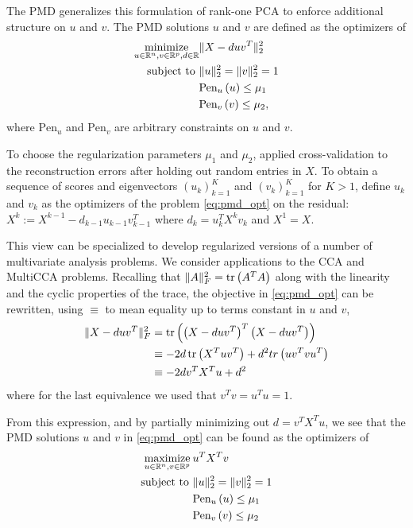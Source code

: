 \documentclass[utf8]{frontiersFPHY} %
\begin{document}
The PMD generalizes this formulation of rank-one PCA to enforce additional
structure on $u$ and $v$. The PMD solutions $u$ and $v$ are defined as the
optimizers of
\begin{align}
\label{eq:pmd_opt} \mathop\mathrm{minimize}_{u \in \mathbb{R}^{n}, v \in \mathbb{R}^{p}, d
  \in \mathbb{R}} &\|X - duv^{T}\|_{2}^{2} \\ \text{subject to } &\|u\|_{2}^{2} =
\|v\|_{2}^{2} = 1 \nonumber \\ & \text{Pen}_{u}\left(u\right) \leq \mu_{1}
\nonumber \\ & \text{Pen}_{v}\left(v\right) \leq \mu_{2}, \nonumber
\end{align}
where $\text{Pen}_u$ and $\text{Pen}_v$ are arbitrary constraints on $u$ and
$v$.

To choose the regularization parameters $\mu_{1}$ and $\mu_{2}$,
\citep{witten2009penalized} applied cross-validation to the reconstruction
errors after holding out random entries in $X$. To obtain a sequence of scores
and eigenvectors $\left(u_{k}\right)_{k = 1}^{K}$ and $\left(v_{k}\right)_{k =
  1}^{K}$ for $K > 1$, define $u_{k}$ and $v_{k}$ as the optimizers of the
problem \ref{eq:pmd_opt} on the residual: $X^{k} := X^{k - 1} - d_{k - 1}u_{k -
  1}v_{k - 1}^{T}$ where $d_{k} = u_{k}^{T} X^{k}v_{k}$ and $X^{1} = X$.

This view can be specialized to develop regularized versions of a number of
multivariate analysis problems. We consider applications to the CCA and MultiCCA
problems. Recalling that $\|A\|_{F}^{2} = \mathop\mathrm{tr}\left(A^{T}A\right)$ along with the
linearity and the cyclic properties of the trace, the objective in
\ref{eq:pmd_opt} can be rewritten, using $\equiv$ to mean equality up to terms
constant in $u$ and $v$,
\begin{align*}
  \|X - duv^{T}\|_{F}^{2} &= \mathop\mathrm{tr}\left(\left(X - duv^{T}\right)^{T}\left(X -
  duv^{T}\right)\right) \\ &\equiv -2d\mathop\mathrm{tr}\left(X^{T}uv^{T}\right) +
  d^{2}tr\left(uv^{T}vu^{T}\right) \\ &\equiv -2d v^{T}X^{T}u + d^{2}
\end{align*}
where for the last equivalence we used that $v^{T}v = u^{T}u = 1$.

From this expression, and by partially minimizing out $d = v^{T}X^{T}u$, we see
that the PMD solutions $u$ and $v$ in \ref{eq:pmd_opt} can be found as the
optimizers of
\begin{align}
\label{eq:pmd_reform}  \mathop\mathrm{maximize}_{u \in \mathbb{R}^{n}, v \in \mathbb{R}^{p}} \medspace &u^{T}X^{T}v \\
  \text{subject to } &\|u\|_{2}^{2} = \|v\|_{2}^{2} = 1 \nonumber
  \\ &\text{Pen}_{u}\left(u\right) \leq \mu_{1}\nonumber
  \\ &\text{Pen}_{v}\left(v\right) \leq \mu_{2} \nonumber
\end{align}
\end{document}
